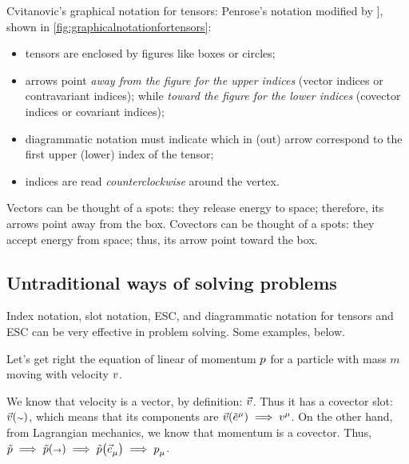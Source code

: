 %
Cvitanovic's graphical notation for tensors: Penrose's notation modified by \cite[p.27]{cvitanovic:2008}], shown in \cref{fig:graphicalnotationfortensors}:
%
\begin{itemize}
  \item tensors are enclosed by figures like boxes or circles;
  \item arrows point \emph{away from the figure for the upper indices} (vector indices or contravariant indices); while \emph{toward the figure for the lower indices} (covector indices or covariant indices);
  \item diagrammatic notation must indicate which in (out) arrow correspond to the first upper (lower) index of the tensor;
  \item indices are read \emph{counterclockwise} around the vertex.
\end{itemize}

 Vectors can be thought of a  spots: they release energy to space; therefore, its arrows point away from the box. Covectors can be thought of a  spots: they accept energy from space; thus, its arrow point toward the box.


\subsection{Untraditional ways of solving problems}
%
Index notation, slot notation, ESC, and diagrammatic notation for tensors and ESC can be very effective in problem solving. Some examples, below.

 Let's get right the equation of linear of momentum $p$ for a particle with mass $m$ moving with velocity $v$.

We know that velocity is a vector, by definition: $\vec{v}$. Thus it has a covector slot: $\vec\vel\vat\cslot$, which means that its components are $\vec\vel\vat{\tbcov\mu}\implies\tvec\vel\mu$. On the other hand, from Lagrangian mechanics, we know that momentum is a covector. Thus, $\cov\lmom\implies\cov\lmom\vat\vslot\implies\cov\lmom\vat{\tbvec\mu}\implies\tcov\lmom\mu$.

